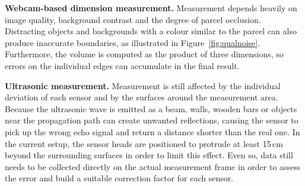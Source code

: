 \textbf{Webcam-based dimension measurement.} Measurement depends heavily on image quality, background contrast and the degree of parcel occlusion. Distracting objects and backgrounds with a colour similar to the parcel can also produce inaccurate boundaries, as illustrated in Figure~\ref{fig:qualnoise}. Furthermore, the volume is computed as the product of three dimensions, so errors on the individual edges can accumulate in the final result.

\textbf{Ultrasonic measurement.} Measurement is still affected by the individual deviation of each sensor and by the surfaces around the measurement area. Because the ultrasonic wave is emitted as a beam, walls, wooden bars or objects near the propagation path can create unwanted reflections, causing the sensor to pick up the wrong echo signal and return a distance shorter than the real one. In the current setup, the sensor heads are positioned to protrude at least 15\,cm beyond the surrounding surfaces in order to limit this effect. Even so, data still needs to be collected directly on the actual measurement frame in order to assess the error and build a suitable correction factor for each sensor.
